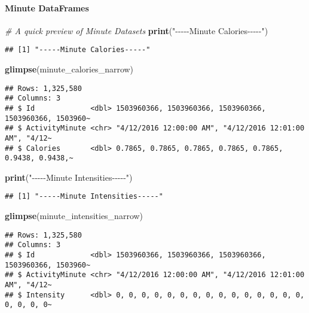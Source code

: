 \documentclass[
]{article}
\newenvironment{Shaded}{\begin{snugshade}}{\end{snugshade}}
\newcommand{\CommentTok}[1]{\textcolor[rgb]{0.56,0.35,0.01}{\textit{#1}}}
\newcommand{\FunctionTok}[1]{\textcolor[rgb]{0.13,0.29,0.53}{\textbf{#1}}}
\newcommand{\NormalTok}[1]{#1}
\newcommand{\StringTok}[1]{\textcolor[rgb]{0.31,0.60,0.02}{#1}}
\begin{document}
\hypertarget{minute-dataframes}{%
\paragraph{Minute DataFrames}\label{minute-dataframes}}

\begin{Shaded}
\begin{Highlighting}[]
\CommentTok{\# A quick preview of Minute Datasets}
\FunctionTok{print}\NormalTok{(}\StringTok{"{-}{-}{-}{-}{-}Minute Calories{-}{-}{-}{-}{-}"}\NormalTok{)}
\end{Highlighting}
\end{Shaded}

\begin{verbatim}
## [1] "-----Minute Calories-----"
\end{verbatim}

\begin{Shaded}
\begin{Highlighting}[]
\FunctionTok{glimpse}\NormalTok{(minute\_calories\_narrow)}
\end{Highlighting}
\end{Shaded}

\begin{verbatim}
## Rows: 1,325,580
## Columns: 3
## $ Id             <dbl> 1503960366, 1503960366, 1503960366, 1503960366, 1503960~
## $ ActivityMinute <chr> "4/12/2016 12:00:00 AM", "4/12/2016 12:01:00 AM", "4/12~
## $ Calories       <dbl> 0.7865, 0.7865, 0.7865, 0.7865, 0.7865, 0.9438, 0.9438,~
\end{verbatim}

\begin{Shaded}
\begin{Highlighting}[]
\FunctionTok{print}\NormalTok{(}\StringTok{"{-}{-}{-}{-}{-}Minute Intensities{-}{-}{-}{-}{-}"}\NormalTok{)}
\end{Highlighting}
\end{Shaded}

\begin{verbatim}
## [1] "-----Minute Intensities-----"
\end{verbatim}

\begin{Shaded}
\begin{Highlighting}[]
\FunctionTok{glimpse}\NormalTok{(minute\_intensities\_narrow)}
\end{Highlighting}
\end{Shaded}

\begin{verbatim}
## Rows: 1,325,580
## Columns: 3
## $ Id             <dbl> 1503960366, 1503960366, 1503960366, 1503960366, 1503960~
## $ ActivityMinute <chr> "4/12/2016 12:00:00 AM", "4/12/2016 12:01:00 AM", "4/12~
## $ Intensity      <dbl> 0, 0, 0, 0, 0, 0, 0, 0, 0, 0, 0, 0, 0, 0, 0, 0, 0, 0, 0~
\end{verbatim}
\end{document}
